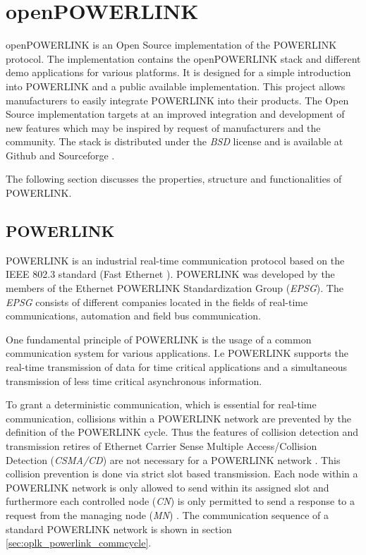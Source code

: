 \chapter{openPOWERLINK}
\label{cha:oplk}
openPOWERLINK is an Open Source implementation of the POWERLINK protocol.
The implementation contains the openPOWERLINK stack and different demo applications for various platforms.
It is designed for a simple introduction into POWERLINK and a public available implementation.
This project allows manufacturers to easily integrate POWERLINK into their products.
The Open Source implementation targets at an improved integration and development of new features which may be inspired by request of manufacturers and the community.
The stack is distributed under the \emph{BSD} license and is available at Github \cite{openpowerlink_github} and Sourceforge \cite{openpowerlink_sourceforge}.

The following section discusses the properties, structure and functionalities of POWERLINK.

\section{POWERLINK}
\label{sec:oplk_powerlink}
POWERLINK is an industrial real-time communication protocol based on the IEEE 802.3 standard (Fast Ethernet \cite{ethernet_ieee_2016}).
POWERLINK was developed by the members of the Ethernet POWERLINK Standardization Group (\emph{EPSG}).
The \emph{EPSG} consists of different companies located in the fields of real-time communications, automation and field bus communication. \cite{epsg_hp}

One fundamental principle of POWERLINK is the usage of a common communication system for various applications.
I.e POWERLINK supports the real-time transmission of data for time critical applications and a simultaneous transmission of less time critical asynchronous information.

To grant a deterministic communication, which is essential for real-time communication, collisions within a POWERLINK network are prevented by the definition of the POWERLINK cycle.
Thus the features of collision detection and transmission retires of Ethernet Carrier Sense Multiple Access/Collision Detection (\emph{CSMA/CD}) are not necessary for a POWERLINK network \cite[section 4.2]{ethernet_ieee_2016}.
This collision prevention is done via strict slot based transmission.
Each node within a POWERLINK network is only allowed to send within its assigned slot and furthermore each controlled node (\emph{CN}) is only permitted to send a response to a request from the managing node (\emph{MN}) \cite[chapter 1]{epsg_epsg_2013}.
The communication sequence of a standard POWERLINK network is shown in section \ref{sec:oplk_powerlink_commcycle}.

